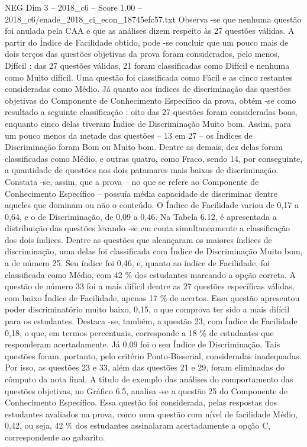 \begin{textsample}{NEG Dim 3 – 2018\_c6 – Score 1.00 – 2018\_c6/enade\_2018\_ci\_econ\_18745efc57.txt}
Observa -se que nenhuma questão foi anulada pela CAA e que as análises dizem respeito às 27 questões válidas.
A partir do Índice de Facilidade obtido, pode -se concluir que um pouco mais de dois terços das questões objetivas da prova foram considerados, pelo menos, Difícil : das 27 questões válidas, 21 foram classificadas como Difícil e nenhuma como Muito difícil.
Uma questão foi classificada como Fácil e as cinco restantes consideradas como Médio.
Já quanto aos índices de discriminação das questões objetivas do Componente de Conhecimento Específico da prova, obtém -se como resultado a seguinte classificação : oito das 27 questões foram consideradas boas, enquanto cinco delas tiveram Índice de Discriminação Muito bom.
Assim, para um pouco menos da metade das questões – 13 em 27 – os Índices de Discriminação foram Bom ou Muito bom.
Dentre as demais, dez delas foram classificadas como Médio, e outras quatro, como Fraco, sendo 14, por conseguinte, a quantidade de questões nos dois patamares mais baixos de discriminação.
Constata -se, assim, que a prova – no que se refere ao Componente de Conhecimento Específico – possuía média capacidade de discriminar dentre aqueles que dominam ou não o conteúdo.
O Índice de Facilidade variou de 0,17 a 0,64, e o de Discriminação, de 0,09 a 0,46.
Na Tabela 6.12, é apresentada a distribuição das questões levando -se em conta simultaneamente a classificação dos dois índices.
Dentre as questões que alcançaram os maiores índices de discriminação, uma delas foi classificada com Índice de Discriminação Muito bom, a de número 25.
Seu índice foi 0,46, e, quanto ao índice de Facilidade, foi classificada como Médio, com 42 \% dos estudantes marcando a opção correta.
A questão de número 33 foi a mais difícil dentre as 27 questões específicas válidas, com baixo Índice de Facilidade, apenas 17 \% de acertos.
Essa questão apresentou poder discriminatório muito baixo, 0,15, o que comprova ter sido a mais difícil para os estudantes.
Destaca -se, também, a questão 23, com Índice de Facilidade 0,18, o que, em termos percentuais, corresponde a 18 \% de estudantes que responderam acertadamente.
Já 0,09 foi o seu Índice de Discriminação.
Tais questões foram, portanto, pelo critério Ponto-Bisserial, consideradas inadequadas.
Por isso, as questões 23 e 33, além das questões 21 e 29, foram eliminadas do cômputo da nota final.
A título de exemplo das análises do comportamento das questões objetivas, no Gráfico 6.5, analisa -se a questão 25 do Componente de Conhecimento Específico.
Essa questão foi considerada, pelas respostas dos estudantes avaliados na prova, como uma questão com nível de facilidade Médio, 0,42, ou seja, 42 \% dos estudantes assinalaram acertadamente a opção C, correspondente ao gabarito.

\end{textsample}

